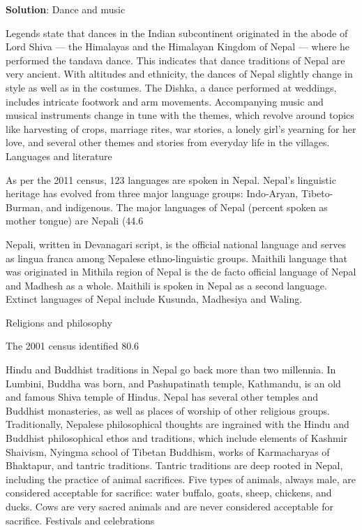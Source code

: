 \documentclass[
]{book}
\newenvironment{solution}{ {\bfseries Solution}:}{}
\begin{document}
\begin{questions}
\begin{solution}
Dance and music

Legends state that dances in the Indian subcontinent originated in the abode of Lord Shiva — the Himalayas and the Himalayan Kingdom of Nepal — where he performed the tandava dance. This indicates that dance traditions of Nepal are very ancient. With altitudes and ethnicity, the dances of Nepal slightly change in style as well as in the costumes. The Dishka, a dance performed at weddings, includes intricate footwork and arm movements. Accompanying music and musical instruments change in tune with the themes, which revolve around topics like harvesting of crops, marriage rites, war stories, a lonely girl’s yearning for her love, and several other themes and stories from everyday life in the villages.
Languages and literature

As per the 2011 census, 123 languages are spoken in Nepal. Nepal’s linguistic heritage has evolved from three major language groups: Indo-Aryan, Tibeto-Burman, and indigenous. The major languages of Nepal (percent spoken as mother tongue) are Nepali (44.6%

Nepali, written in Devanagari script, is the official national language and serves as lingua franca among Nepalese ethno-linguistic groups. Maithili language that was originated in Mithila region of Nepal is the de facto official language of Nepal and Madhesh as a whole. Maithili is spoken in Nepal as a second language. Extinct languages of Nepal include Kusunda, Madhesiya and Waling.

Religions and philosophy

The 2001 census identified 80.6%

Hindu and Buddhist traditions in Nepal go back more than two millennia. In Lumbini, Buddha was born, and Pashupatinath temple, Kathmandu, is an old and famous Shiva temple of Hindus. Nepal has several other temples and Buddhist monasteries, as well as places of worship of other religious groups. Traditionally, Nepalese philosophical thoughts are ingrained with the Hindu and Buddhist philosophical ethos and traditions, which include elements of Kashmir Shaivism, Nyingma school of Tibetan Buddhism, works of Karmacharyas of Bhaktapur, and tantric traditions. Tantric traditions are deep rooted in Nepal, including the practice of animal sacrifices. Five types of animals, always male, are considered acceptable for sacrifice: water buffalo, goats, sheep, chickens, and ducks. Cows are very sacred animals and are never considered acceptable for sacrifice.
Festivals and celebrations


\end{solution}
\end{questions}
\end{document}
